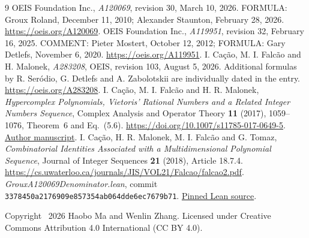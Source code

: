 \documentclass[11pt]{article}
\begin{document}
\begin{thebibliography}{9}
 OEIS Foundation Inc., \emph{A120069},
revision 30, March 10, 2026. FORMULA: Groux Roland, December 11, 2010;
Alexander Staunton, February 28, 2026.
\url{https://oeis.org/A120069}.
 OEIS Foundation Inc., \emph{A119951},
revision 32, February 16, 2025. COMMENT: Pieter Mostert,
October 12, 2012; FORMULA: Gary Detlefs, November 6, 2020.
\url{https://oeis.org/A119951}.
 I. Ca\c{c}\~ao, M. I. Falc\~ao and H. Malonek,
\emph{A283208}, OEIS, revision 103, August 5, 2026.
Additional formulas by R. Ser\'odio, G. Detlefs and A. Zabolotskii
are individually dated in the entry.
\url{https://oeis.org/A283208}.
 I. Ca\c{c}\~ao, M. I. Falc\~ao and H. R. Malonek,
\emph{Hypercomplex Polynomials, Vietoris' Rational Numbers and a
Related Integer Numbers Sequence}, Complex Analysis and Operator Theory
\textbf{11} (2017), 1059--1076, Theorem~6 and Eq.~(5.6).
\url{https://doi.org/10.1007/s11785-017-0649-5}.
\href{https://hdl.handle.net/1822/45794}{Author manuscript}.
 I. Ca\c{c}\~ao, H. R. Malonek, M. I. Falc\~ao
and G. Tomaz, \emph{Combinatorial Identities Associated with a
Multidimensional Polynomial Sequence}, Journal of Integer Sequences
\textbf{21} (2018), Article 18.7.4.
\url{https://cs.uwaterloo.ca/journals/JIS/VOL21/Falcao/falcao2.pdf}.
 \emph{GrouxA120069Denominator.lean},
commit \texttt{3378450a2176909e857354ab064dde6ec7679b71}.
\href{https://github.com/the-omega-institute/trureturing/blob/3378450a2176909e857354ab064dde6ec7679b71/D5/S3/ArithSums/GrouxA120069Denominator.lean}{Pinned Lean source}.
\end{thebibliography}
\bigskip\noindent\small
Copyright \textcopyright\ 2026 Haobo Ma and Wenlin Zhang.
Licensed under Creative Commons Attribution 4.0 International (CC BY 4.0).
\end{document}
